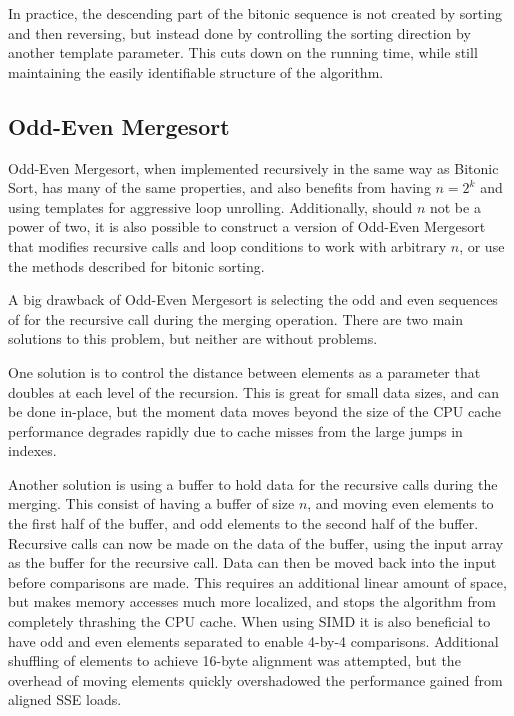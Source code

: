 In practice, the descending part of the bitonic sequence is not created by sorting and then reversing, but instead done by controlling the sorting direction by another template parameter. This cuts down on the running time, while still maintaining the easily identifiable structure of the algorithm.

\subsection{Odd-Even Mergesort}
\label{OEMergesortImpl}

Odd-Even Mergesort, when implemented recursively in the same way as Bitonic Sort, has many of the same properties, and also benefits from having $n = 2^k$ and using templates for aggressive loop unrolling. Additionally, should $n$ not be a power of two, it is also possible to construct a version of Odd-Even Mergesort that modifies recursive calls and loop conditions to work with arbitrary $n$, or use the methods described for bitonic sorting.

A big drawback of Odd-Even Mergesort is selecting the odd and even sequences of for the recursive call during the merging operation. There are two main solutions to this problem, but neither are without problems.

One solution is to control the distance between elements as a parameter that doubles at each level of the recursion. This is great for small data sizes, and can be done in-place, but the moment data moves beyond the size of the CPU cache performance degrades rapidly due to cache misses from the large jumps in indexes.

Another solution is using a buffer to hold data for the recursive calls during the merging. This consist of having a buffer of size $n$, and moving even elements to the first half of the buffer, and odd elements to the second half of the buffer. Recursive calls can now be made on the data of the buffer, using the input array as the buffer for the recursive call. Data can then be moved back into the input before comparisons are made. This requires an additional linear amount of space, but makes memory accesses much more localized, and stops the algorithm from completely thrashing the CPU cache. When using SIMD it is also beneficial to have odd and even elements separated to enable 4-by-4 comparisons.
Additional shuffling of elements to achieve 16-byte alignment was attempted, but the overhead of moving elements quickly overshadowed the performance gained from aligned SSE loads. 

